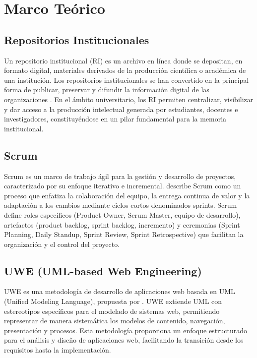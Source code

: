 \section{Marco Teórico}
\label{sec:marco-teorico}

\subsection{Repositorios Institucionales}

Un repositorio institucional (RI) es un archivo en línea donde se depositan, en formato digital, materiales derivados de la producción científica o académica de una institución. Los repositorios institucionales se han convertido en la principal forma de publicar, preservar y difundir la información digital de las organizaciones \textcite{wikipedia2024repositorio}. En el ámbito universitario, los RI permiten centralizar, visibilizar y dar acceso a la producción intelectual generada por estudiantes, docentes e investigadores, constituyéndose en un pilar fundamental para la memoria institucional.

\subsection{Scrum}

Scrum es un marco de trabajo ágil para la gestión y desarrollo de proyectos, caracterizado por su enfoque iterativo e incremental. \textcite{pressman2014} describe Scrum como un proceso que enfatiza la colaboración del equipo, la entrega continua de valor y la adaptación a los cambios mediante ciclos cortos denominados sprints. Scrum define roles específicos (Product Owner, Scrum Master, equipo de desarrollo), artefactos (product backlog, sprint backlog, incremento) y ceremonias (Sprint Planning, Daily Standup, Sprint Review, Sprint Retrospective) que facilitan la organización y el control del proyecto.

\subsection{UWE (UML-based Web Engineering)}

UWE es una metodología de desarrollo de aplicaciones web basada en UML (Unified Modeling Language), propuesta por \textcite{koch2001uwe}. UWE extiende UML con estereotipos específicos para el modelado de sistemas web, permitiendo representar de manera sistemática los modelos de contenido, navegación, presentación y procesos. Esta metodología proporciona un enfoque estructurado para el análisis y diseño de aplicaciones web, facilitando la transición desde los requisitos hasta la implementación.

